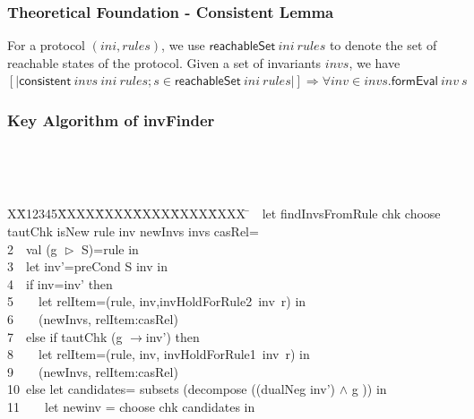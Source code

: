 \documentclass{beamer}
\newlength{\fminilength}
\newenvironment{fmini}[1][\linewidth]
  {\setlength{\fminilength}{#1\fboxsep-2\fboxrule}%
   \vspace{2ex}\noindent\begin{lrbox}{\fminibox}\begin{minipage}{\fminilength}%
   \mbox{ }\hfill\vspace{-2.5ex}}%
  {\end{minipage}\end{lrbox}\vspace{1ex}\hspace{0ex}%
   \framebox{\usebox{\fminibox}}}
\newenvironment{specification}
{\noindent\scriptsize
\tt\begin{fmini}\begin{tabbing}X\=X12345\=XXXX\=XXXX\=XXXX\=XXXX\=XXXX
\=\+\kill} {\end{tabbing}\normalfont\end{fmini}}
\def \twoSpaces {\ \ }
\def \oneSpace {\ }
\def \oneSpace {\ }
\def \andc {\wedge }
\begin{document}
\begin{frame}\frametitle{Theoretical Foundation - Consistent Lemma}

\begin{lemma}\label{consistentLemma}%
For a protocol $( ini,  rules)$,
we use $\mathsf{reachableSet}~   ini~ rules$
to denote the set of reachable states of the protocol.
Given a set of invariants $ invs$,
we have
$[| \mathsf{consistent}~  invs ~ ini~  rules;
  s \in \mathsf{reachableSet}~  ini~rules|]\Longrightarrow
  \forall  inv \in invs. \mathsf{formEval}~ inv ~s$
\end{lemma}
\end{frame}



\begin{frame}\frametitle{Key Algorithm of {\sf invFinder}}
\begin{specification}
1\twoSpaces let findInvsFromRule  chk choose  tautChk isNew rule inv newInvs invs casRel=\\
2\twoSpaces   val (g $\vartriangleright$ S)=rule in\\

3\twoSpaces   let inv'=preCond S inv in\\


4\twoSpaces   if  inv=inv' then\\

5\twoSpaces  \twoSpaces       let relItem=(rule,
inv,invHoldForRule2~inv~r) in\\
6\twoSpaces  \twoSpaces         (newInvs, relItem:casRel)\\


7\twoSpaces   else if  tautChk (g $\longrightarrow$inv') then\\
8\twoSpaces  \twoSpaces     let relItem=(rule, inv, invHoldForRule1~inv~r) in \\
9\twoSpaces  \twoSpaces        (newInvs, relItem:casRel)   \\


10\oneSpace   else let  candidates= subsets (decompose ((dualNeg inv') $\andc$ g ))  in\\

11\twoSpaces  \twoSpaces  let newinv =  choose chk candidates in\\



\end{specification}
\end{frame}
\end{document}
